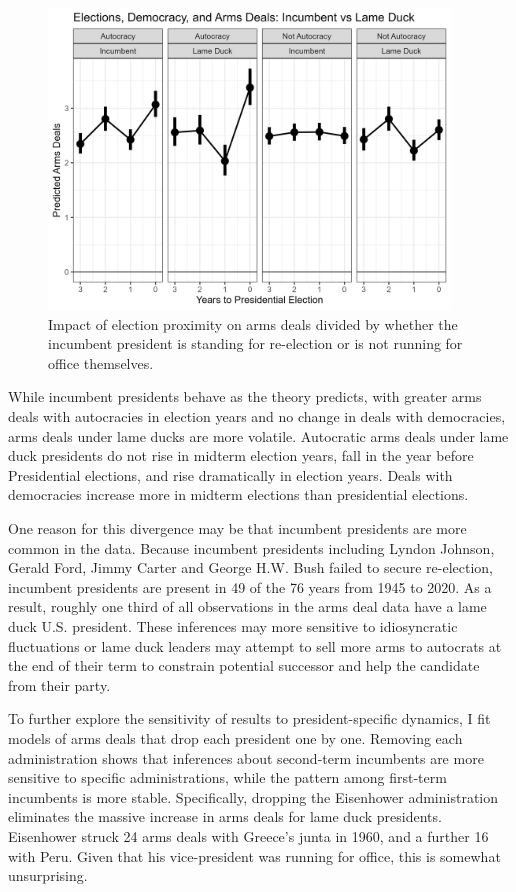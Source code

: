 \documentclass[12pt]{article}
\begin{document}
\begin{figure}[htpb]
	\centering
		\includegraphics[width=0.95\textwidth]{incum-deals-pred.png}
	\caption{Impact of election proximity on arms deals divided by whether the incumbent president is standing for re-election or is not running for office themselves.}
	\label{fig:incum-deals-pred}
\end{figure}

While incumbent presidents behave as the theory predicts, with greater arms deals with autocracies in election years and no change in deals with democracies, arms deals under lame ducks are more volatile. 
Autocratic arms deals under lame duck presidents do not rise in midterm election years, fall in the year before Presidential elections, and rise dramatically in election years. 
Deals with democracies increase more in midterm elections than presidential elections. 


One reason for this divergence may be that incumbent presidents are more common in the data. 
Because incumbent presidents including Lyndon Johnson, Gerald Ford, Jimmy Carter and George H.W. Bush failed to secure re-election, incumbent presidents are present in 49 of the 76 years from 1945 to 2020. 
As a result, roughly one third of all observations in the arms deal data have a lame duck U.S. president.
These inferences may more sensitive to idiosyncratic fluctuations or lame duck leaders may attempt to sell more arms to autocrats at the end of their term to constrain potential successor and help the candidate from their party. 


To further explore the sensitivity of results to president-specific dynamics, I fit models of arms deals that drop each president one by one. 
Removing each administration shows that inferences about second-term incumbents are more sensitive to specific administrations, while the pattern among first-term incumbents is more stable.
Specifically, dropping the Eisenhower administration eliminates the massive increase in arms deals for lame duck presidents. 
Eisenhower struck 24 arms deals with Greece's junta in 1960, and a further 16 with Peru. 
Given that his vice-president was running for office, this is somewhat unsurprising. 
\end{document}
